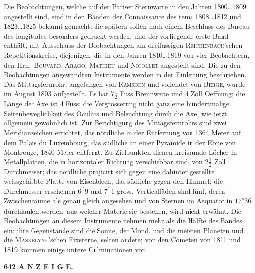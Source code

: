 \documentclass[12pt,a4paper]{article}
\begin{document}
Die Beobachtungen, welche auf der Pariser Sternwarte in den Jahren 1800\dots 1809 angestellt sind, sind in den B\"anden der Connaissance des tems 1808\dots 1812 und 1823\dots 1825 bekannt gemacht; die sp\"atern sollen nach einem Beschluss des Bureau des longitudes besonders gedruckt werden, und der vorliegende erste Band enth\"alt, mit Ausschluss der Beobachtungen am dreifussigen \textsc{Reichenbach}'schen Repetitionskreise, diejenigen, die in den Jahren 1810\dots 1819 von vier Beobachtern, den Hrn.\ \textsc{Bouvard}, \textsc{Arago}, \textsc{Mathieu} und \textsc{Nicollet} angestellt sind. Die zu den Beobachtungen angewandten Instrumente werden in der Einleitung beschrieben. Das Mittagsfernrohr, angefangen von \textsc{Ramsden} und vollendet von \textsc{Berge}, wurde im August 1803 aufgestellt. Es hat $7\frac{1}{2}$ Fuss Brennweite und 4 Zoll Oeffnung; die L\"ange der Axe ist 4 Fuss; die Vergr\"osserung nicht ganz eine hundertmalige. Seitenbeweglichkeit des Oculars und Beleuchtung durch die Axe, wie jetzt allgemein gew\"ohnlich ist. Zur Berichtigung des Mittagsfernrohrs sind zwei Meridianzeichen errichtet, das n\"ordliche in der Entfernung von 1364 Meter auf dem Palais du Luxembourg, das s\"udliche an einer Pyramide in der Ebne von Montrouge, 1840 Meter entfernt. Zu Zielpunkten dienen kreisrunde L\"ocher in Metallplatten, die in horizontaler Richtung verschiebbar sind, von $2\frac{1}{2}$ Zoll Durchmesser; das n\"ordliche projicirt sich gegen eine dahinter gestellte weissgef\"arbte Platte von Eisenblech, das s\"udliche gegen den Himmel; die Durchmesser erscheinen $6^{\prime\prime}_{,}9$ und $7^{\prime\prime}_{,}1$ gross. Verticalf\"aden sind f\"unf, deren Zwischenr\"aume als genau gleich angesehen und von Sternen im Aequator in $17^{s}_{,}36$ durchlaufen werden; aus welcher Materie sie bestehen, wird nicht erw\"ahnt. Die Beobachtungen an diesem Instrumente nehmen mehr als die H\"alfte des Bandes ein; ihre Gegenst\"ande sind die Sonne, der Mond, und die meisten Planeten und die \textsc{Maskelyne}'schen Fixsterne, selten andere; von den Cometen von 1811 und 1819 kommen einige untere Culminationen vor.

\begin{center}\small\textbf{642 A N Z E I G E.}\end{center}
\end{document}
